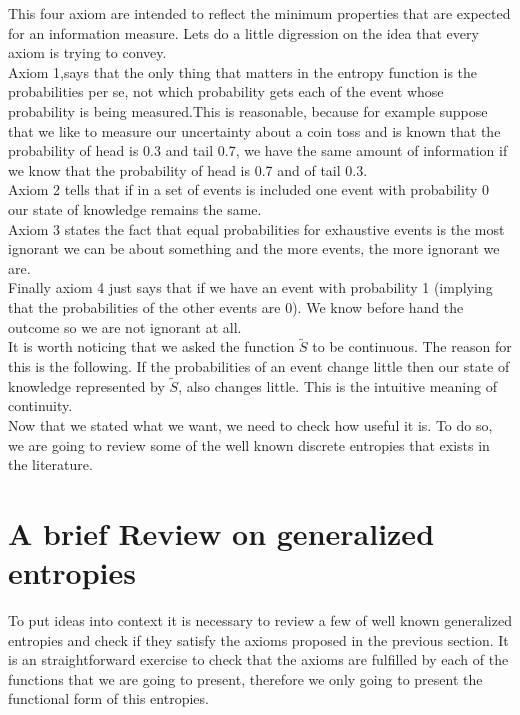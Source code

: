 \documentclass[11pt]{article}
\theoremstyle{plain}
\begin{document}
This four axiom are intended to reflect the minimum properties
that are expected for an information measure. Lets do a little digression on the idea that every axiom is trying to convey. 
\newline
\\
Axiom 1,says that the only thing that matters in the entropy function is the
probabilities per se, not which probability gets each of the event
whose probability is being measured.This is reasonable, because  for example suppose that we like to
measure our uncertainty about a coin toss and is known that the
probability of head is 0.3 and tail 0.7, we have the same amount
of information if we know that the probability of head is 0.7 and
of tail 0.3. 
\newline
\\
Axiom 2 tells  that if in a set of events is included
one event with probability 0 our state of knowledge remains the
same.
\newline
\\
Axiom 3 states the fact that equal probabilities for
exhaustive events is the most ignorant we can be about something
and the more  events, the more ignorant we are. 
\newline
\\
Finally axiom 4
just says that if we have an event with probability 1 (implying
that the probabilities of the other events are  0). We know before
hand  the outcome so we are not ignorant at all.\medskip
\newline
\\
It is worth noticing that we asked the function $\tilde{S}$ to be continuous. The reason for this is the following. If the probabilities of an event change little then our state of knowledge represented by $\tilde{S}$, also changes little. This is the intuitive meaning of continuity.
\medskip
\\
Now that we stated what we want, we need to check how useful it is. To do so, we are going to review some of the well known discrete entropies that exists in the literature.




\section{A brief Review on generalized entropies}
To put ideas into context it is necessary to review a few of well
known generalized entropies and check if they satisfy the axioms proposed in the previous section. It is an straightforward exercise to check that the axioms are fulfilled by each of the functions that we are going to present, therefore we only going to present the functional form of this entropies.
\end{document}
